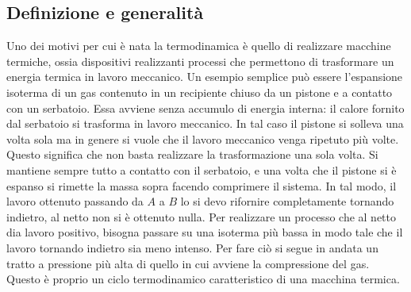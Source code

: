 \subsection{Definizione e generalità}

Uno dei motivi per cui è nata la termodinamica è quello di realizzare macchine termiche, ossia dispositivi realizzanti processi che permettono di trasformare un energia termica in lavoro meccanico. Un esempio semplice può essere l'espansione isoterma di un gas contenuto in un recipiente chiuso da un pistone e a contatto con un serbatoio. Essa avviene senza accumulo di energia interna: il calore fornito dal serbatoio si trasforma in lavoro meccanico. In tal caso il pistone si solleva una volta sola ma in genere si vuole che il lavoro meccanico venga ripetuto più volte. Questo significa che non basta realizzare la trasformazione una sola volta. Si mantiene sempre tutto a contatto con il serbatoio, e una volta che il pistone si è espanso si rimette la massa sopra facendo comprimere il sistema. In tal modo, il lavoro ottenuto passando da $A$ a $B$ lo si devo rifornire completamente tornando indietro, al netto non si è ottenuto nulla. Per realizzare un processo che al netto dia lavoro positivo, bisogna passare su una isoterma più bassa in modo tale che il lavoro tornando indietro sia meno intenso. Per fare ciò si segue in andata un tratto a pressione più alta di quello in cui avviene la compressione del gas. Questo è proprio un ciclo termodinamico caratteristico di una macchina termica.

